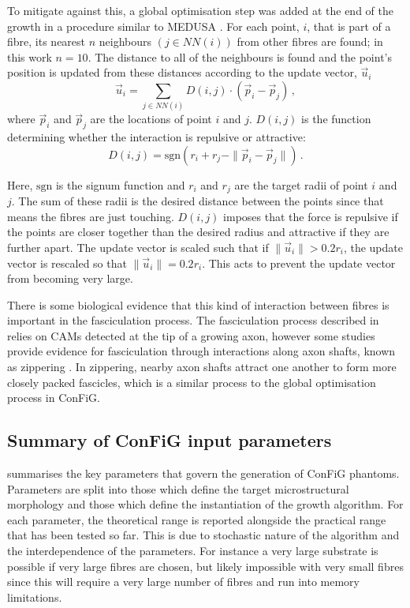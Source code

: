 To mitigate against this, a global optimisation step was added at the end of the growth in a procedure similar to MEDUSA \cite{Ginsburger2019}. For each point, $i$, that is part of a fibre, its nearest $n$ neighbours $(j \in NN(i))$ from other fibres are found; in this work $n=10$. The distance to all of the neighbours is found and the point’s position is updated from these distances according to the update vector, $\vec{u}_i$
\begin{equation}
  \label{eq:global_opt_update_vec}
\vec{u}_i= \sum_{j \in NN(i)} D(i,j) \cdot \left(\vec{p}_i - \vec{p}_j\right) \,,
\end{equation}
where $\vec{p}_i$ and $\vec{p}_j$ are the locations of point $i$ and $j$. $D(i,j)$ is the function determining whether the interaction is repulsive or attractive:
\begin{equation}
  \label{eq:global_opt_Dij}
  D(i, j) = \mathrm{sgn}\left(r_i + r_j - \|\vec{p}_i - \vec{p}_j\|\right) \,.
\end{equation}

Here, $\mathrm{sgn}$ is the signum function and $r_i$ and $r_j$ are the target radii of point $i$ and $j$. The sum of these radii is the desired distance between the points since that means the fibres are just touching. $D(i,j)$ imposes that the force is repulsive if the points are closer together than the desired radius and attractive if they are further apart. The update vector is scaled such that if $\|\vec{u}_i\| > 0.2r_i$, the update vector is rescaled so that $\|\vec{u}_i\|=0.2r_i$. This acts to prevent the update vector from becoming very large.

There is some biological evidence that this kind of interaction between fibres is important in the fasciculation process. The fasciculation process described in  relies on \acp{CAM} detected at the tip of a growing axon, however some studies provide evidence for fasciculation through interactions along axon shafts, known as zippering \cite{Barry2010,Smit2017,Voyiadjis2011}. In zippering, nearby axon shafts attract one another to form more closely packed fascicles, which is a similar process to the global optimisation process in \ac{ConFiG}.

\subsection{Summary of \acs{ConFiG} input parameters}
\label{sec:config_summary_of_input}
 summarises the key parameters that govern the generation of \ac{ConFiG} phantoms. Parameters are split into those which define the target microstructural morphology and those which define the instantiation of the growth algorithm. For each parameter, the theoretical range is reported alongside the practical range that has been tested so far. This is due to stochastic nature of the algorithm and the interdependence of the parameters. For instance a very large substrate is possible if very large fibres are chosen, but likely impossible with very small fibres since this will require a very large number of fibres and run into memory limitations.

